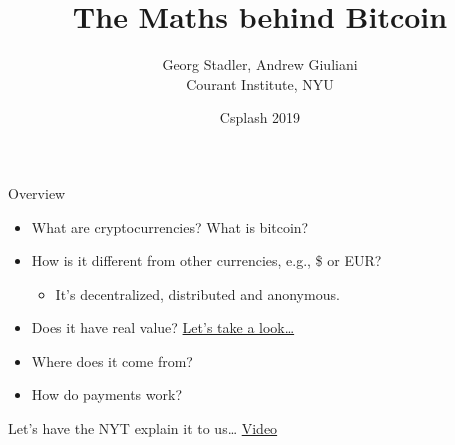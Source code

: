 \documentclass[12pt]{beamer}
\title{{\bf The Maths behind Bitcoin }}
\date{Csplash 2019}
\author{Georg Stadler, Andrew Giuliani \\ Courant Institute, NYU}
\theoremstyle{definition}
\numberwithin{equation}{section}
\begin{document}
\begin{frame}
\maketitle
\end{frame}


\begin{frame}{Overview}
  \begin{itemize}
  \item What are cryptocurrencies? What is bitcoin?\\[3ex]
    \pause
  \item How is it different from other currencies, e.g., \$ or EUR? \\[1ex]
    \pause
    \begin{itemize}
      \item It's decentralized, distributed and anonymous.\\[1ex]
    \end{itemize}
    \pause
  \item Does it have real value?
    \href{https://www.coindesk.com/price/}{Let's take a look\ldots}\\[3ex]
    \pause
  \item Where does it come from?\\[3ex]
    \pause
  \item How do payments work?
  \end{itemize}
\end{frame}


\begin{frame}{Let's have the NYT explain it to us\ldots}
\centering
  \href{https://www.nytimes.com/video/business/100000005675385/baffled-by-bitcoin-heres-how-cryptocurrency-works.html?smid=pl-share}{\Large
    Video}\\[3ex]  
\end{frame}
\end{document}
